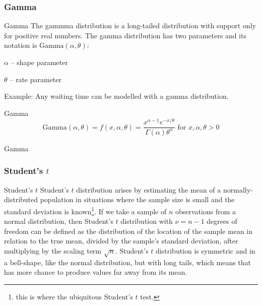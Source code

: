 \subsubsection{Gamma}
\begin{frame}{Gamma}
	The gammma distribution is a long-tailed distribution with support only for positive real numbers.
	\vfill
	The gamma distribution has two parameters and its notation is
	$\text{Gamma}(\alpha, \theta)$:
	\begin{vfilleditems}
		\item $\alpha$ -- shape parameter
		\item $\theta$ -- rate parameter
	\end{vfilleditems}
	\vfill
	Example: Any waiting time can be modelled with a gamma distribution.
\end{frame}

\begin{frame}{Gamma}
	$$\text{Gamma}(\alpha, \theta) = f(x, \alpha, \theta) = \frac{x^{\alpha-1} e^{-x/\theta}}{\Gamma(\alpha) \theta^\alpha} \text{ for $x,\alpha,\theta > 0$}$$
\end{frame}

\begin{frame}{Gamma}
	\centering
\end{frame}

\subsubsection{Student's $t$}
\begin{frame}{Student's $t$}
	Student's $t$ distribution arises by estimating the mean of a normally-distributed
	population in situations where the sample size is small and the standard
	deviation is known\footnote{this is where the ubiquitous Student's $t$ test.}.
	\vfill
	If we take a sample of $n$ observations from a normal distribution,
	then Student's $t$ distribution with $\nu = n-1$ degrees of freedom can
	be defined as the distribution of the location of the sample mean
	in relation to the true mean, divided by the sample's standard deviation,
	after multiplying by the scaling term $\sqrt{n}$.
	\vfill
	Student's $t$ distribution is symmetric and in a bell-shape,
	like the normal distribution, but with long tails,
	which means that has more chance to produce values far away from its mean.
\end{frame}

